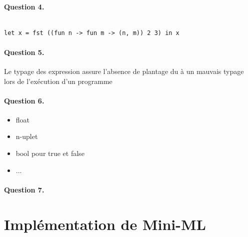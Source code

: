 \documentclass[a4paper, titlepage]{livret}
\begin{document}
\paragraph{Question 4.}

\begin{verbatim}

let x = fst ((fun n -> fun m -> (n, m)) 2 3) in x

\end{verbatim}

\paragraph{Question 5.}

Le typage des expression assure l'absence de plantage du à un mauvais typage
lors de l'exécution d'un programme

\paragraph{Question 6.}

\begin{itemize}

\item float
\item n-uplet
\item bool pour true et false
\item ...

\end{itemize}

\paragraph{Question 7.}




\section{Implémentation de Mini-ML}
\end{document}

